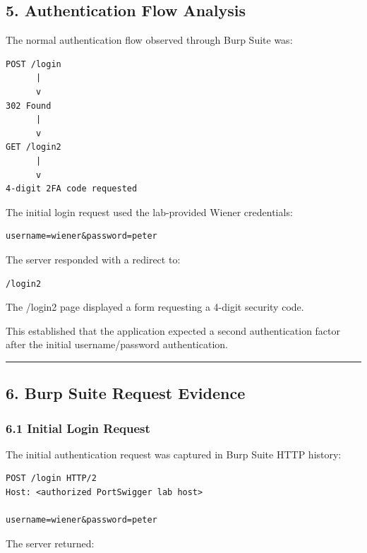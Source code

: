 \documentclass[
]{article}
\begin{document}
\subsection{5. Authentication Flow
Analysis}\label{authentication-flow-analysis}

The normal authentication flow observed through Burp Suite was:

\begin{verbatim}
POST /login
      |
      v
302 Found
      |
      v
GET /login2
      |
      v
4-digit 2FA code requested
\end{verbatim}

The initial login request used the lab-provided Wiener credentials:

\begin{verbatim}
username=wiener&password=peter
\end{verbatim}

The server responded with a redirect to:

\begin{verbatim}
/login2
\end{verbatim}

The /login2 page displayed a form requesting a 4-digit security code.

This established that the application expected a second authentication
factor after the initial username/password authentication.

\begin{center}\rule{0.5\linewidth}{0.5pt}\end{center}

\subsection{6. Burp Suite Request
Evidence}\label{burp-suite-request-evidence}

\subsubsection{6.1 Initial Login Request}\label{initial-login-request}

The initial authentication request was captured in Burp Suite HTTP
history:

\begin{verbatim}
POST /login HTTP/2
Host: <authorized PortSwigger lab host>

username=wiener&password=peter
\end{verbatim}

The server returned:
\end{document}
